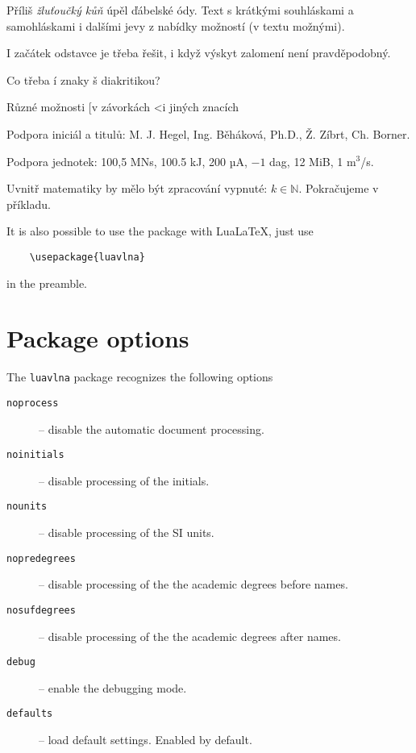 \documentclass[12pt]{ltxdoc}
\begin{document}

\noindent
\begin{minipage}{3in}
\preventsingledebugon
{}
Příliš \textit{žluťoučký kůň} úpěl ďábelské ódy. 
Text s krátkými souhláskami a samohláskami i dalšími jevy z nabídky možností (v textu možnými). 

I začátek odstavce je třeba řešit, i když výskyt zalomení není pravděpodobný.

Co třeba í znaky š diakritikou?

Různé možnosti [v závorkách \textless i jiných znacích

Podpora iniciál a titulů: M. J. Hegel, Ing. Běháková, Ph.D., Ž. Zíbrt, Ch. Borner.

Podpora jednotek: 100,5 MN\cdot{}s, 100.5 kJ, 200 µA, $-1$ dag, 12 MiB, 1 m$^3$/s.

Uvnitř matematiky by mělo být zpracování vypnuté:  $k \in \mathbb N$. Pokračujeme v příkladu.

\preventsingledebugoff
\end{minipage}

\bigskip
It is also possible to use the package with Lua\LaTeX, just use

\begin{verbatim}
	\usepackage{luavlna}
\end{verbatim}

in the preamble.

\section{Package options}
The \verb|luavlna| package recognizes the following options

\begin{description}
  \item[\texttt{noprocess}] -- disable the automatic document processing.
  \item[\texttt{noinitials}] -- disable processing of the initials.
  \item[\texttt{nounits}] -- disable processing of the SI units.
  \item[\texttt{nopredegrees}] -- disable processing of the the academic degrees before names.
  \item[\texttt{nosufdegrees}] -- disable processing of the the academic degrees after names.
  \item[\texttt{debug}] -- enable the debugging mode.
  \item[\texttt{defaults}] -- load default settings. Enabled by default.
\end{description}
\end{document}
